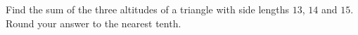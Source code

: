 Find the sum of the three altitudes of a triangle with side lengths $13$, $14$ and $15$. Round your answer to the nearest tenth.
